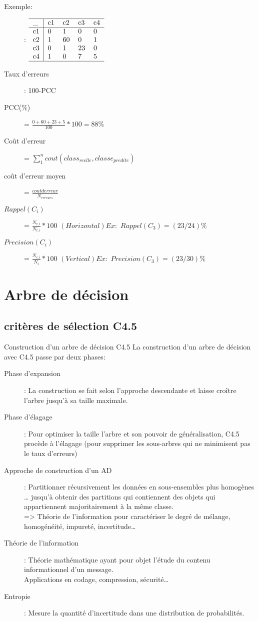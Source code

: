 Exemple:\\
\begin{description}
\item[]: $
  \begin{tabular}{l|llll}
  \hline
  \_  & c1 & c2 & c3 & c4 \\
  \hline
   c1 & 0  & 1  &  0 & 0  \\
   c2 & 1  & 60 &  0 & 1  \\
   c3 & 0  & 1  & 23 & 0  \\
   c4 & 1  & 0  &  7 & 5  \\
  \hline
  \end{tabular}$
\item[Taux d'erreurs]: 100-PCC
\item[PCC(\%)] = $ \frac{0+60+23+5}{100} * 100 = 88\% $ 
\item[Coût d'erreur] = $\sum_1^n cout(class_{reelle}, classe_{predite})$
\item[coût d'erreur moyen] = $\frac{cout derreur}{N_{erreurs}}$
\item[$Rappel(C_i)$] = $\frac{N_{c\_i}}{N_{t\_i}} * 100$ $(Horizontal)Ex:$ $Rappel(C_3)=(23/24)\%$
\item[$Precision(C_i)$] = $\frac{N_{c\_i}}{N_{i}} * 100$ $(Vertical) Ex:$ $Precision(C_3)=(23/30)\%$
\end{description}


\chapter{Arbre de décision}
\section{critères de sélection C4.5}

Construction d’un arbre de décision C4.5  La construction d'un arbre de décision avec C4.5 passe par deux phases:  
\begin{description}
\item[Phase d'expansion]: La construction se fait selon l'approche descendante et laisse croître l'arbre jusqu'à sa taille maximale.  
\item[Phase d'élagage]: Pour optimiser la taille l'arbre et son pouvoir de généralisation, C4.5 procède à l'élagage (pour supprimer les sous-arbres qui ne minimisent pas le taux d'erreurs)
\item[Approche de construction d’un AD]: Partitionner récursivement les données en sous-ensembles plus homogènes  … jusqu’à obtenir des partitions qui contiennent des objets qui appartiennent majoritairement à la même classe. \\
=> Théorie de l’information pour caractériser le degré de mélange, homogénéité, impureté, incertitude…
\item[Théorie de l’information]: Théorie mathématique ayant pour objet l’étude du contenu informationnel d’un message. \\
 Applications en codage, compression, sécurité… 
\item[Entropie]: Mesure la quantité d’incertitude dans une distribution de probabilités.
\end{description}

